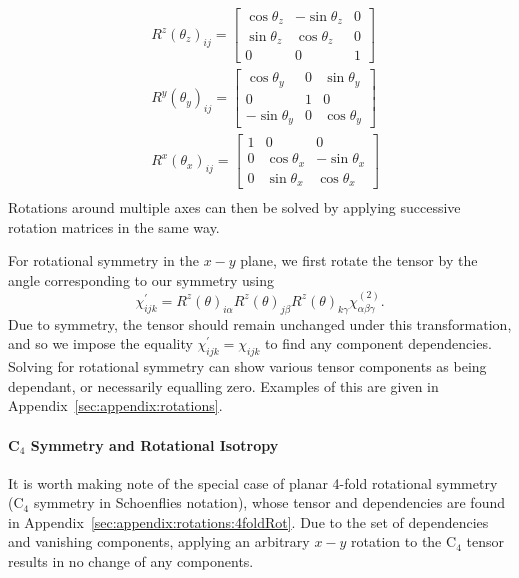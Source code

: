\begin{equation}\label{eq:background:NonlinearOptics:rotation:AllRotationMatrices}
\begin{split}
	&R^{z}(\theta_{z})_{ij} =
	\begin{bmatrix}
		\cos{\theta_{z}} & -\sin{\theta_{z}} & 0\\ 
		\sin{\theta_{z}} & \cos{\theta_{z}} & 0\\ 
		0 & 0 & 1
	\end{bmatrix}\\	
	&R^{y}(\theta_{y})_{ij} =
	\begin{bmatrix}
		\cos{\theta_{y}} & 0 & \sin{\theta_{y}}\\ 
		0 & 1 & 0\\ 
		-\sin{\theta_{y}} & 0 & \cos{\theta_{y}}
	\end{bmatrix}\\	
	&R^{x}(\theta_{x})_{ij} =
	\begin{bmatrix}
		1 & 0 & 0\\ 
		0 & \cos{\theta_{x}} & -\sin{\theta_{x}}\\ 
		0 & \sin{\theta_{x}} & \cos{\theta_{x}}
	\end{bmatrix}\\	
\end{split}
\end{equation}
Rotations around multiple axes can then be solved by applying successive rotation matrices in the same way. 

For rotational symmetry in the $x-y$ plane, we first rotate the tensor by the angle corresponding to our symmetry using
\begin{equation}\label{eq:background:NonlinearOptics:rotation:RotateChi}
	\chi_{ijk}^{\prime} =  R^{z}(\theta)_{i\alpha}R^{z}(\theta)_{j\beta}R^{z}(\theta)_{k\gamma}\chi^{(2)}_{\alpha \beta \gamma}.
\end{equation}
Due to symmetry, the tensor should remain unchanged under this transformation, and so we impose the equality $\chi_{ijk}^{\prime}=\chi_{ijk}$ to find any component dependencies. Solving for rotational symmetry can show various tensor components as being dependant, or necessarily equalling zero. Examples of this are given in Appendix~\ref{sec:appendix:rotations}.


\paragraph{C\texorpdfstring{$_4$}{Lg} Symmetry and Rotational Isotropy} \label{sec:appendix:RotIso}
It is worth making note of the special case of planar 4-fold rotational symmetry (C$_4$ symmetry in Schoenflies notation), whose tensor and dependencies are found in Appendix~\ref{sec:appendix:rotations:4foldRot}. Due to the set of dependencies and vanishing components, applying an arbitrary $x-y$ rotation to the C$_4$ tensor results in no change of any components. 


